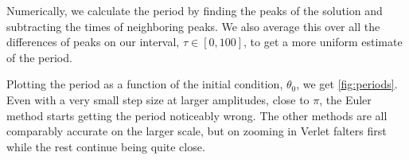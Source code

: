 \documentclass[10pt,a4paper,twocolumn]{article}
\begin{document}
Numerically, we calculate the period by finding the peaks of the solution and subtracting the times of neighboring peaks. We also average this over all the differences of peaks on our interval, $\tau \in [0, 100]$, to get a more uniform estimate of the period.

Plotting the period as a function of the initial condition, $\theta_0$, we get \cref{fig:periods}. Even with a very small step size at larger amplitudes, close to $\pi$, the Euler method starts getting the period noticeably wrong. The other methods are all comparably accurate on the larger scale, but on zooming in Verlet falters first while the rest continue being quite close.

\printbibliography
\end{document}

